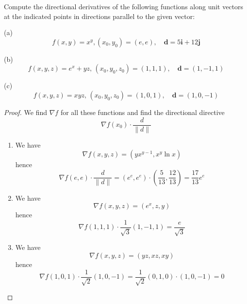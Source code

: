 \documentclass[openany]{book}
\begin{document}
\begin{prob}[2.6, Q3]
Compute the directional derivatives of the following functions along unit vectors at the indicated points in directions parallel to the given vector:

(a)
\begin{equation*}
    f(x, y) = x^y, (x_0, y_0) = (e, e), \quad \mathbf{d} = 5\mathbf{i} + 12\mathbf{j}
\end{equation*}

(b)  
\[
f(x, y, z) = e^x + yz, \, (x_0, y_0, z_0) = (1, 1, 1), \quad \mathbf{d} = (1, -1, 1)
\]

(c)  
\[
f(x, y, z) = xyz, \, (x_0, y_0, z_0) = (1, 0, 1), \quad \mathbf{d} = (1, 0, -1)
\]
\end{prob}
\begin{proof}
    We find $\nabla f$ for all these functions and find the directional directive 
    \begin{equation*}
        \nabla f(x_0)\cdot \frac{d}{\|d\|}
    \end{equation*}
    \begin{enumerate}
        \item[(a)] We have 
        \begin{equation*}
            \nabla f(x,y,z)=(yx^{y-1}, x^y\ln x)
        \end{equation*}
        hence 
        \begin{equation*}
            \nabla f(e,e)\cdot \frac{d}{\|d\|}=(e^e,e^e)\cdot\left(\frac{5}{13},\frac{12}{13}\right)=\frac{17}{13}e^e
        \end{equation*}
        \item[(b)] We have 
        \begin{equation*}
            \nabla f(x,y,z)=(e^x, z, y)
        \end{equation*}
        hence 
        \begin{equation*}
            \nabla f(1,1,1)\cdot \frac{1}{\sqrt{3}}(1,-1,1)=\frac{e}{\sqrt{3}}
        \end{equation*}
        \item[(c)] We have 
        \begin{equation*}
            \nabla f(x,y,z)=(yz, xz, xy)
        \end{equation*}
        hence 
        \begin{equation*}
            \nabla f(1,0,1)\cdot \frac{1}{\sqrt{2}}(1,0,-1)=\frac{1}{\sqrt{2}}(0,1,0)\cdot(1,0,-1)=0
        \end{equation*}
    \end{enumerate}
\end{proof}
\end{document}
